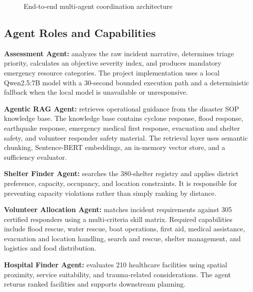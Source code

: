 \documentclass[conference]{IEEEtran}
\begin{document}
\begin{figure}[htbp]
{%
}
\caption{End-to-end multi-agent coordination architecture}
\label{fig1}
\end{figure}

\subsection{Agent Roles and Capabilities}
\textbf{Assessment Agent:} analyzes the raw incident narrative, determines triage priority, calculates an objective severity index, and produces mandatory emergency resource categories. The project implementation uses a local Qwen2.5:7B model with a 30-second bounded execution path and a deterministic fallback when the local model is unavailable or unresponsive.

\textbf{Agentic RAG Agent:} retrieves operational guidance from the disaster SOP knowledge base. The knowledge base contains cyclone response, flood response, earthquake response, emergency medical first response, evacuation and shelter safety, and volunteer responder safety material. The retrieval layer uses semantic chunking, Sentence-BERT embeddings, an in-memory vector store, and a sufficiency evaluator.

\textbf{Shelter Finder Agent:} searches the 380-shelter registry and applies district preference, capacity, occupancy, and location constraints. It is responsible for preventing capacity violations rather than simply ranking by distance.

\textbf{Volunteer Allocation Agent:} matches incident requirements against 305 certified responders using a multi-criteria skill matrix. Required capabilities include flood rescue, water rescue, boat operations, first aid, medical assistance, evacuation and location handling, search and rescue, shelter management, and logistics and food distribution.

\textbf{Hospital Finder Agent:} evaluates 210 healthcare facilities using spatial proximity, service suitability, and trauma-related considerations. The agent returns ranked facilities and supports downstream planning.
\end{document}
